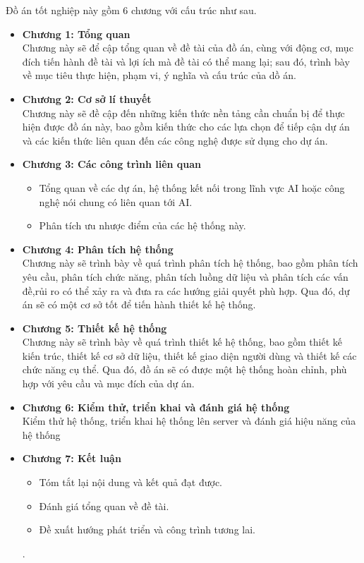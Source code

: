 Đồ án tốt nghiệp này gồm 6 chương với cấu trúc như sau.
\begin{itemize}
    \item \textbf{Chương 1: Tổng quan}\\
Chương này sẽ để cập tổng quan về đề tài của đồ án, cùng với động cơ, mục đích tiến hành đề tài và lợi ích mà đề tài có thể mang lại; sau đó, trình bày về mục tiêu thực hiện, phạm vi, ý nghĩa và cấu trúc của dồ án.
    \item \textbf{Chương 2: Cơ sở lí thuyết}\\
Chương này sẽ đề cập đến những kiến thức nền tảng cần chuẩn bị để thực hiện được đồ án này, bao gồm kiến thức cho các lựa chọn để tiếp cận dự án và các kiến thức liên quan đến các công nghệ được sử dụng cho dự án.
    \item \textbf{Chương 3: Các công trình liên quan}
    \begin{itemize}
        \item[-] Tổng quan về các dự án, hệ thống kết nối trong lĩnh vực AI hoặc công nghệ nói chung có liên quan tới AI.
        \item[-] Phân tích ưu nhược điểm của các hệ thống này.
    \end{itemize}
    \item \textbf{Chương 4: Phân tích hệ thống}\\
Chương này sẽ trình bày về quá trình phân tích hệ thống, bao gồm phân tích yêu cầu, phân tích chức năng, phân tích luồng dữ liệu và phân tích các vấn đề,rủi ro có thể xảy ra và đưa ra các hướng giải quyết phù hợp. Qua đó, dự án sẽ có một cơ sở tốt để tiến hành thiết kế hệ thống.
    \item \textbf{Chương 5: Thiết kế hệ thống}\\
Chương này sẽ trình bày về quá trình thiết kế hệ thống, bao gồm thiết kế kiến trúc, thiết kế cơ sở dữ liệu, thiết kế giao diện người dùng và thiết kế các chức năng cụ thể. Qua đó, đồ án sẽ có được một hệ thống hoàn chỉnh, phù hợp với yêu cầu và mục đích của dự án.
    \item \textbf{Chương 6: Kiểm thử, triển khai và đánh giá hệ thống}\\
    Kiểm thử hệ thống, triển khai hệ thống lên server và đánh giá hiệu năng của hệ thống
    \item \textbf{Chương 7: Kết luận}
    \begin{itemize}
        \item[-] Tóm tắt lại nội dung và kết quả đạt được.
        \item[-] Đánh giá tổng quan về đề tài.
        \item[-] Đề xuất hướng phát triển và công trình tương lai.
    \end{itemize}
    .
\end{itemize}

